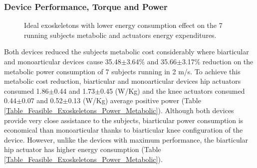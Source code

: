 \documentclass[10pt,letterpaper]{article}
\begin{document}
\subsubsection*{Device Performance, Torque and Power}
\begin{figure*}[h!]
	\centering
	\hfil
	\hfil
	\caption{Ideal exoskeletons with lower energy consumption effect on the 7 running subjects metabolic and actuators energy expenditures.}
	\label{Fig_FeasibleExos_MetabolicCost_EnergyConsumption}
\end{figure*}
Both devices reduced the subjects metabolic cost considerably where biarticular and monoarticular devices cause 35.48$\pm$3.64\% and 35.66$\pm$3.17\% reduction on the metabolic power consumption of 7 subjects running in 2 m/s. To achieve this metabolic cost reduction, biarticular and monoarticular devices hip actuators consumed 1.86$\pm$0.44 and 1.73$\pm$0.45 (W/Kg) and the knee actuators consumed 0.44$\pm$0.07 and 0.52$\pm$0.13 (W/Kg) average positive power (Table \ref{Table_Feasible_Exoskeletons_Power_Metabolic}). Although both devices provide very close assistance to the subjects, biarticular power consumption is economical than monoarticular thanks to biarticular knee configuration of the device. However, unlike the devices with maximum performance, the biarticular hip actuator has higher energy consumption (Table \ref{Table_Feasible_Exoskeletons_Power_Metabolic}).
\end{document}
